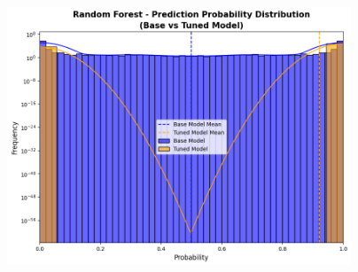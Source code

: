                 \begin{minipage}{\textwidth}
                    \centering
                    \begin{minipage}[c]{\textwidth}
                        \centering
                        \includegraphics[width=0.77\textwidth]{../figures/plots/section2/Random_Forest_Probability_distribution.png}
                        \label{fig:rf_cm_base}
                    \end{minipage}%
                \end{minipage}
                
        \clearpage %
        